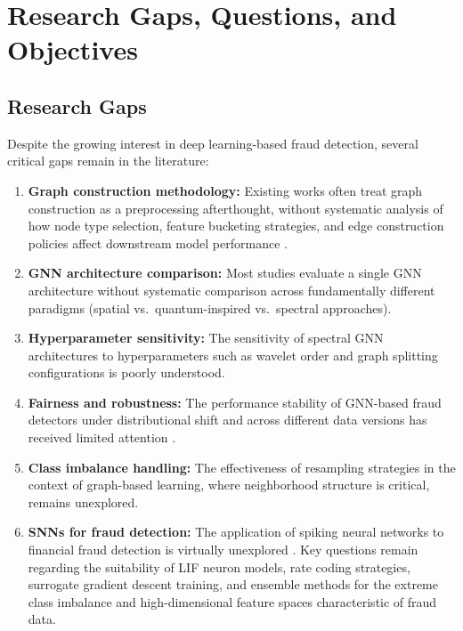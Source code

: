 \section{Research Gaps, Questions, and Objectives}

\subsection{Research Gaps}

Despite the growing interest in deep learning-based fraud detection, several critical gaps remain in the literature:

\begin{enumerate}[label=\arabic*.]
\item \textbf{Graph construction methodology:} Existing works often treat graph construction as a preprocessing afterthought, without systematic analysis of how node type selection, feature bucketing strategies, and edge construction policies affect downstream model performance \cite{islam2023effects}.
\item \textbf{GNN architecture comparison:} Most studies evaluate a single GNN architecture without systematic comparison across fundamentally different paradigms (spatial vs.\ quantum-inspired vs.\ spectral approaches).
\item \textbf{Hyperparameter sensitivity:} The sensitivity of spectral GNN architectures to hyperparameters such as wavelet order and graph splitting configurations is poorly understood.
\item \textbf{Fairness and robustness:} The performance stability of GNN-based fraud detectors under distributional shift and across different data versions has received limited attention \cite{chouldechova2017fair,kozodoi2022fairness}.
\item \textbf{Class imbalance handling:} The effectiveness of resampling strategies \cite{chawla2002smote,he2008adasyn} in the context of graph-based learning, where neighborhood structure is critical, remains unexplored.
\item \textbf{SNNs for fraud detection:} The application of spiking neural networks to financial fraud detection is virtually unexplored \cite{nasif2026reinforcement}. Key questions remain regarding the suitability of LIF neuron models, rate coding strategies, surrogate gradient descent training, and ensemble methods for the extreme class imbalance and high-dimensional feature spaces characteristic of fraud data.

\end{enumerate}
